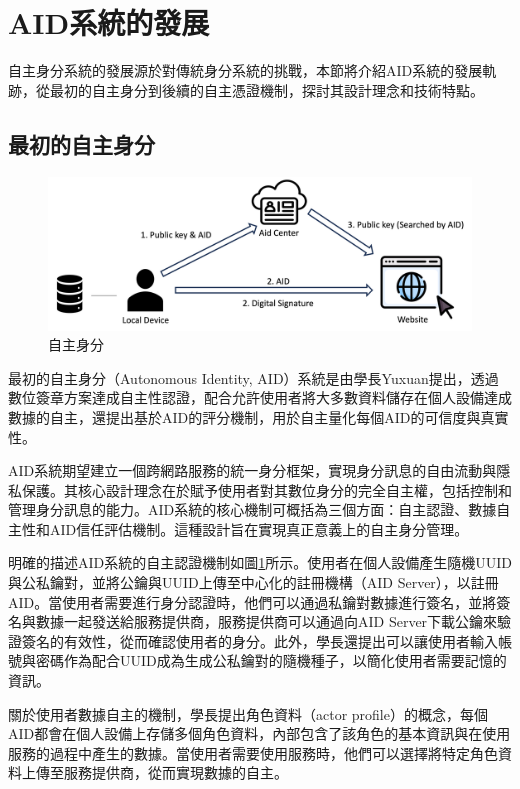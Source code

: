 \section{AID系統的發展}
自主身分系統的發展源於對傳統身分系統的挑戰，本節將介紹AID系統的發展軌跡，從最初的自主身分到後續的自主憑證機制，探討其設計理念和技術特點。
\subsection{最初的自主身分}
\begin{figure}
  \centering
  \includegraphics[width=\linewidth,keepaspectratio]{figures/old-aid.png}
  \caption{自主身分}
  \label{fig:old-aid}
\end{figure}
最初的自主身分（Autonomous Identity, AID）系統是由學長Yuxuan提出\cite{ntu-lin2014autonomous}，透過數位簽章方案達成自主性認證，配合允許使用者將大多數資料儲存在個人設備達成數據的自主，還提出基於AID的評分機制，用於自主量化每個AID的可信度與真實性。

AID系統期望建立一個跨網路服務的統一身分框架，實現身分訊息的自由流動與隱私保護。其核心設計理念在於賦予使用者對其數位身分的完全自主權，包括控制和管理身分訊息的能力。AID系統的核心機制可概括為三個方面：自主認證、數據自主性和AID信任評估機制。這種設計旨在實現真正意義上的自主身分管理。

明確的描述AID系統的自主認證機制如圖\ref{fig:old-aid}所示。使用者在個人設備產生隨機UUID與公私鑰對，並將公鑰與UUID上傳至中心化的註冊機構（AID Server），以註冊AID。當使用者需要進行身分認證時，他們可以通過私鑰對數據進行簽名，並將簽名與數據一起發送給服務提供商，服務提供商可以通過向AID Server下載公鑰來驗證簽名的有效性，從而確認使用者的身分。此外，學長還提出可以讓使用者輸入帳號與密碼作為配合UUID成為生成公私鑰對的隨機種子，以簡化使用者需要記憶的資訊。

關於使用者數據自主的機制，學長提出角色資料（actor profile）的概念，每個AID都會在個人設備上存儲多個角色資料，內部包含了該角色的基本資訊與在使用服務的過程中產生的數據。當使用者需要使用服務時，他們可以選擇將特定角色資料上傳至服務提供商，從而實現數據的自主。

